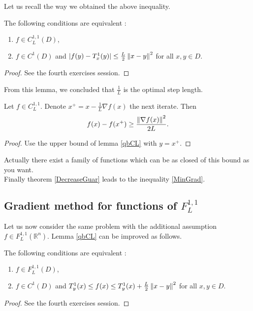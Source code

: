 Let us recall the way we obtained the above inequality.

\begin{lemma}
The following conditions are equivalent :
\begin{enumerate}%
\item $f \in C_L^{1,1}(D)$,
\item $f \in C^1(D)$ and $|f(y) - T_x^1(y)| \le \frac{L}{2}\left\Vert x-y \right\Vert^2$ for all $x,y \in D$.
\end{enumerate}
\label{qbCL}
\end{lemma}
\begin{proof}
See the fourth exercises session.
\end{proof}

From this lemma, we concluded that $\frac{1}{L}$ is the optimal step length.

\begin{theorem}
Let $f \in C_L^{1,1}$. Denote $x^+ = x - \frac{1}{L}\nabla f(x)$ the next iterate. Then
\begin{equation*}
f(x) - f(x^+) \ge \frac{{\left\Vert \nabla f(x) \right\Vert}^2}{2L} .
\end{equation*}
\label{DecreaseGuar}
\end{theorem}
\begin{proof}
Use the upper bound of lemma \ref{qbCL} with $y = x^+$.
\end{proof}
\noindent Actually there exist a family of functions which can be as closed of this bound as you want. \\

Finally theorem \ref{DecreaseGuar} leads to the inequality \eqref{MinGrad}.

\subsection{Gradient method for functions of $F_L^{1,1}$}

Let us now consider the same problem with the additional assumption $f \in F_L^{1,1}(\mathbb{R}^n)$. Lemma \ref{qbCL} can be improved as follows.

\begin{lemma}
The following conditions are equivalent :
\begin{enumerate}%
\item $f \in F_L^{1,1}(D)$,
\item $f \in C^1(D)$ and $T_y^1(x) \le f(x) \le  T_y^1(x) + \frac{L}{2}\left\Vert x-y \right\Vert^2$ for all $x,y \in D$.
\end{enumerate}
\label{qbFL}
\end{lemma}
\begin{proof}
See the fourth exercises session.
\end{proof}

